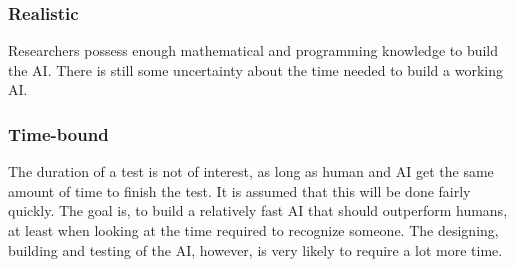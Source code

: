 \documentclass[12pt, titlepage]{article}
\begin{document}
	\subsubsection{Realistic}
	Researchers possess enough mathematical and programming knowledge to build the AI. There is still some uncertainty about the time needed to build a working AI.
	
	\subsubsection{Time-bound}
	The duration of a test is not of interest, as long as human and AI get the same amount of time to finish the test. It is assumed that this will be done fairly quickly. The goal is, to build a relatively fast AI that should outperform humans, at least when looking at the time required to recognize someone. The designing, building and testing of the AI, however, is very likely to require a lot more time.
	
	
\end{document}
